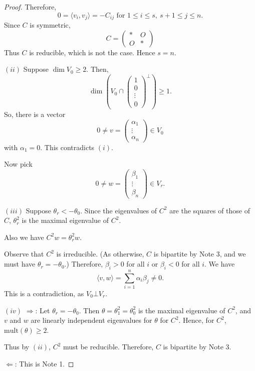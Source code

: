 \documentclass[
]{book}
\theoremstyle{definition}
\theoremstyle{definition}
\theoremstyle{definition}
\theoremstyle{definition}
\theoremstyle{remark}
\begin{document}
\begin{proof}
Therefore,
\[0 = \langle v_i, v_j \rangle = -C_{ij} \textrm{ for } 1\leq i \leq s, \: s+1 \leq j \leq n.\]
Since \(C\) is symmetric,
\[C = \begin{pmatrix} \ast & O \\ O & \ast\end{pmatrix}\]
Thus \(C\) is reducible, which is not the case. Hence \(s = n\).

\hfill\break

\((ii)\)
Suppose \(\dim V_0 \geq 2\). Then,
\[\dim\left(V_0 \cap \begin{pmatrix}1\\0\\\vdots\\0\end{pmatrix}^\bot\right) \geq 1.\]
So, there is a vector
\[0\neq v = \begin{pmatrix}\alpha_1\\\vdots\\\alpha_n\end{pmatrix} \in V_0\]
with \(\alpha_1 = 0\). This contradicts \((i)\).

Now pick
\[0\neq w = \begin{pmatrix}\beta_1\\\vdots\\\beta_n\end{pmatrix} \in V_r.\]

\((iii)\)
Suppose \(\theta_r < -\theta_0\). Since the eigenvalues of \(C^2\) are the squares of those of \(C\), \(\theta_r^2\) is the maximal eigenvalue of \(C^2\).

Also we have \(C^2w = \theta_r^2w\).

Observe that \(C^2\) is irreducible. (As otherwise, \(C\) is bipartite by Note 3, and we must have \(\theta_r = -\theta_0\).)
Therefore, \(\beta_i > 0\) for all \(i\) or \(\beta_i < 0\) for all \(i\). We have
\[\langle v, w\rangle = \sum_{i=1}^n\alpha_i\beta_j \neq 0.\]
This is a contradiction, as \(V_0 \bot V_r\).

\((iv)\)
\(\Rightarrow\): Let \(\theta_r = -\theta_0\). Then \(\theta = \theta_1^2 = \theta_0^2\) is the maximal eigenvalue of \(C^2\), and \(v\) and \(w\) are linearly independent eigenvalues for \(\theta\) for \(C^2\). Hence, for \(C^2\), \(\mathrm{mult}(\theta) \geq 2\).

Thus by \((ii)\), \(C^2\) must be reducible. Therefore, \(C\) is bipartite by Note 3.

\(\Leftarrow\): This is Note 1.
\end{proof}
\end{document}
